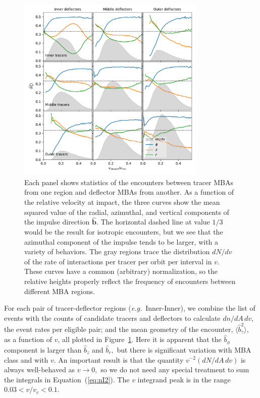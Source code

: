 \documentclass[linenumbers, onecolumn]{aastex631}
\newcommand{\eqq}[1]{Equation~(\ref{#1})}
\newcommand{\eg}{\textit{e.g.\/}}
\newcommand{\bhat}{\mathbf{\hat b}}
\begin{document}
\begin{figure}
  \centering
  \includegraphics[width=0.8\textwidth]{isq.pdf}
  \caption{Each panel shows statistics of the encounters between
    tracer MBAs from one region and deflector MBAs from another.  As a
    function of the relative velocity at impact, the three curves show
    the mean squared value of the radial, azimuthal, and vertical
    components of the impulse direction $\bhat.$  The horizontal
    dashed line at value $1/3$ would be the result for isotropic
    encounters, but we see that the azimuthal component of the impulse
    tends to be larger, with a variety of behaviors.  The gray regions
    trace the distribution $dN/dv$ of the rate of interactions per
    tracer per orbit per interval in $v.$  These curves have a common
    (arbitrary) normalization, so the relative heights properly
    reflect the frequency of encounters between different MBA
    regions.}
  \label{fig:rtz}
\end{figure}

For each pair of tracer-deflector regions (\eg\ Inner-Inner), we combine the list of
events with the counts of candidate tracers and deflectors to
calculate $dn/dA\,dv,$ the event rates per eligible pair; and the mean
geometry of the encounter, $\langle \hat b^2_\gamma \rangle,$ as a
function of $v$, all plotted in Figure~\ref{fig:rtz}.
Here it is apparent that the $\hat b_\phi$ component is
larger than $\hat b_z$ and $\hat b_r,$ but there is significant
variation with MBA class and with $v$.  An important result is that
the quantity $v^{-2} (dN/dA\,dv)$ is always well-behaved as $v\rightarrow 0,$
so we do not need any special treatment to sum the integrals in
\eqq{eq:nI2}.  The $v$ integrand peak is in the range $0.03<v/v_c<0.1.$
\end{document}
